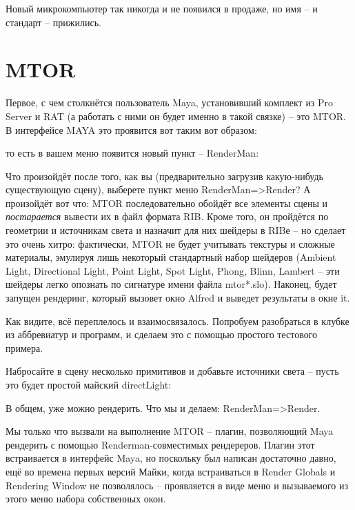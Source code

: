 Новый микрокомпьютер
    так никогда и не появился в продаже, но имя – и стандарт –
    прижились.
  
\section*{MTOR}

 Первое, с чем столкнётся пользователь Maya, установивший комплект из Pro Server и RAT (а работать с ними он будет именно в такой связке)
– это MTOR. В интерфейсе MAYA это проявится вот таким вот образом:


 то есть в вашем меню появится новый пункт – RenderMan:


 Что произойдёт после того, как вы (предварительно
    загрузив какую-нибудь существующую сцену), выберете пункт меню
    RenderMan=>Render? А произойдёт вот что: MTOR последовательно
    обойдёт все элементы сцены и {\it постарается} вывести их в файл
    формата RIB. Кроме того, он пройдётся по геометрии и источникам
    света и назначит для них шейдеры в RIBе – но сделает это очень
    хитро: фактически, MTOR не будет учитывать текстуры и сложные
    материалы, эмулируя лишь некоторый стандартный набор шейдеров
    (Ambient Light, Directional Light, Point Light, Spot Light, Phong,
    Blinn, Lambert – эти шейдеры легко опознать по сигнатуре имени
    файла mtor*.slo). Наконец, будет запущен рендеринг, который вызовет
    окно Alfred и выведет результаты в окне it.

 Как видите, всё переплелось и взаимосвязалось.
    Попробуем разобраться в клубке из аббревиатур и программ, и сделаем
    это с помощью простого тестового примера.

 Набросайте в сцену несколько примитивов и добавьте
    источники света – пусть это будет простой майский
    directLight:


 В общем, уже можно рендерить. Что мы и делаем:
    RenderMan=>Render.

 Мы только что вызвали на выполнение MTOR – плагин,
    позволяющий Maya рендерить  с помощью Renderman-совместимых
    рендереров. Плагин этот встраивается в интерфейс Maya, но поскольку
    был написан достаточно давно, ещё во времена первых версий Майки,
    когда встраиваться в Render Globals и Rendering Window не
    позволялось – проявляется в виде меню и вызываемого из этого меню
    набора собственных окон.

